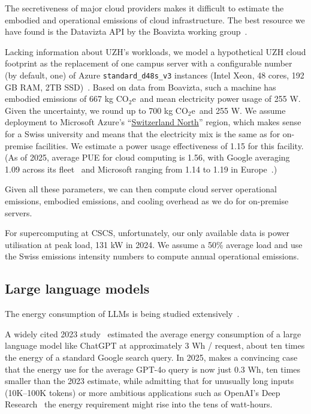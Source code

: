 \documentclass[11pt]{article}
\newcommand{\coe}{CO$_2$e}
\newcommand{\gcoe}{g \coe}
\newcommand{\kgcoe}{k\gcoe}
\begin{document}
The secretiveness of major cloud providers makes it difficult to estimate the embodied and operational emissions of cloud infrastructure. The best resource we have found is the Datavizta API by the Boavizta working group~\cite{boavizta:api}.

Lacking information about UZH's workloads, we model a hypothetical UZH cloud footprint as the replacement of one campus server with a configurable number (by default, one) of Azure {\tt standard\_d48s\_v3} instances (Intel Xeon, 48 cores, 192 GB RAM, 2TB SSD)~\cite{msftvms}. Based on data from Boavizta, such a machine has embodied emissions of 667 \kgcoe\ and mean electricity power usage of 255 W. Given the uncertainty, we round up to 700 \kgcoe\ and 255 W. We assume deployment to Microsoft Azure's ``\href{https://datacenters.microsoft.com/globe/explore?info=region_switzerlandnorth}{Switzerland North}'' region, which makes sense for a Swiss university and means that the electricity mix is the same as for on-premise facilities. We estimate a power usage effectiveness of 1.15 for this facility. (As of 2025, average PUE for cloud computing is 1.56, with Google averaging 1.09 across its fleet~\cite{google:datacenter:efficiency} and Microsoft ranging from 1.14 to 1.19 in Europe~\cite{microsoft:datacenter:efficiency}.)

Given all these parameters, we can then compute cloud server operational emissions, embodied emissions, and cooling overhead as we do for on-premise servers.

For supercomputing at CSCS, unfortunately, our only available data is power utilisation at peak load, 131 kW in 2024. We assume a 50\% average load and use the Swiss emissions intensity numbers to compute annual operational emissions.

\subsection{Large language models}

The energy consumption of LLMs is being studied extensively~\cite{budennyy2022eco2ai,castano2023exploring,devries2023growing,epoch2024optimallyallocatingcomputebetweeninferenceandtraining,gowda2024watt,harding2024watts,heguerte2023estimate,luccioni2022estimating,luccioni2023counting,patterson2021carbon,rodriguez2024evaluating,tripp2024measuring,epoch2025howmuchenergydoeschatgptuse}.

A widely cited 2023 study~\cite{devries2023growing} estimated the average energy consumption of a large language model like ChatGPT at approximately 3 Wh / request, about ten times the energy of a standard Google search query. In 2025, \textcite{epoch2025howmuchenergydoeschatgptuse} makes a convincing case that the energy use for the average GPT-4o query is now just 0.3 Wh, ten times smaller than the 2023 estimate, while admitting that for unusually long inputs (10K--100K tokens) or more ambitious applications such as OpenAI's Deep Research~\cite{oai:deepresearch} the energy requirement might rise into the tens of watt-hours.
\end{document}
